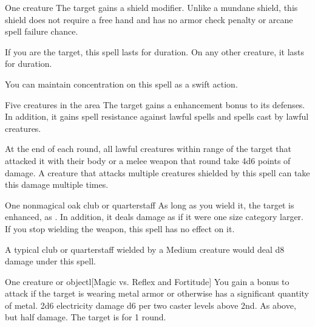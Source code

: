 \spellrng{\rngclose}
\begin{spelltarget}{One creature}
    \spelleffect The target gains a  shield modifier. \spellbonusscalingdescription Unlike a mundane shield, this shield does not require a free hand and has no armor check penalty or arcane spell failure chance.

    \par If you are the target, this spell lasts for \durlong duration. On any other creature, it lasts for \durshort duration.
\end{spelltarget}
\spelleffect You can maintain concentration on this spell as a swift action.

\spelldur{\durshort \dismissable}
\begin{spelltargets}{Five creatures in the area}
    The target gains a  enhancement bonus to its defenses. In addition, it gains spell resistance against lawful spells and spells cast by lawful creatures.
    \par At the end of each round, all lawful creatures within \rngclose range of the target that attacked it with their body or a melee weapon that round take 4d6 points of damage. A creature that attacks multiple creatures shielded by this spell can take this damage multiple times.
\end{spelltargets}

\spelldur{\durshort}
\begin{spelltarget}{One nonmagical oak club or quarterstaff}
    \spelleffect As long as you wield it, the target is enhanced, as . In addition, it deals damage as if it were one size category larger. If you stop wielding the weapon, this spell has no effect on it.
\end{spelltarget}
\spellnotes A typical club or quarterstaff wielded by a Medium creature would deal d8 damage under this spell.

\begin{spelltarget}{One creature or object}l[Magic vs. Reflex and Fortitude]
    \spellspecial You gain a  bonus to attack if the target is wearing metal armor or otherwise has a significant quantity of metal.
    \spellsuccess[Reflex] 2d6 electricity damage \add d6 per two caster levels above 2nd.
    \spellfailure[Reflex] As above, but half damage.
     The target is \staggered for 1 round.
\end{spelltarget}

